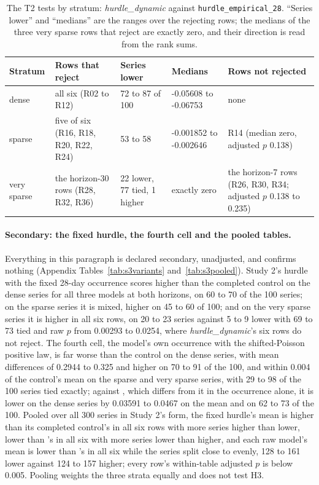 \begin{table}[t]
\centering\small
\caption{The T2 tests by stratum: \emph{hurdle\_dynamic} against \texttt{hurdle\_empirical\_28}. ``Series
lower'' and ``medians'' are the ranges over the rejecting rows; the medians of the three very sparse rows
that reject are exactly zero, and their direction is read from the rank sums.}
\label{tab:s3t2}
\begin{tabular}{lllll}
\toprule
Stratum & Rows that reject & Series lower & Medians & Rows not rejected \\
\midrule
dense & all six (R02 to R12) & 72 to 87 of 100 & -0.05608 to -0.06753 & none \\
sparse & five of six (R16, R18, R20, R22, R24) & 53 to 58 & -0.001852 to -0.002646 & R14 (median zero, adjusted $p$ 0.138) \\
very sparse & the horizon-30 rows (R28, R32, R36) & 22 lower, 77 tied, 1 higher & exactly zero & the horizon-7 rows (R26, R30, R34; adjusted $p$ 0.138 to 0.235) \\
\bottomrule
\end{tabular}
\end{table}

\paragraph{Secondary: the fixed hurdle, the fourth cell and the pooled tables.} Everything in this paragraph
is declared secondary, unadjusted, and confirms nothing (Appendix Tables~\ref{tab:s3variants}
and~\ref{tab:s3pooled}). Study 2's hurdle with the fixed 28-day occurrence scores higher than the completed
control on the dense series for all three models at both horizons, on 60 to 70 of the 100 series; on the
sparse series it is mixed, higher on 45 to 60 of 100; and on the very sparse series it is higher in all six
rows, on 20 to 23 series against 5 to 9 lower with 69 to 73 tied and raw $p$ from 0.00293 to 0.0254, where
\emph{hurdle\_dynamic}'s six rows do not reject. The fourth cell, the model's own occurrence with the
shifted-Poisson positive law, is far worse than the control on the dense series, with mean differences of
0.2944 to 0.325 and higher on 70 to 91 of the 100, and within 0.004 of the control's mean on the sparse and
very sparse series, with 29 to 98 of the 100 series tied exactly; against \hc{}, which differs from it in
the occurrence alone, it is lower on the dense series by 0.03591 to 0.0467 on the mean and on 62 to 73 of
the 100. Pooled over all 300 series in Study 2's form, the fixed hurdle's mean is higher than its completed
control's in all six rows with more series higher than lower, lower than \hc{}'s in all six with more series
lower than higher, and each raw model's mean is lower than \lm{}'s in all six while the series split close
to evenly, 128 to 161 lower against 124 to 157 higher; every row's within-table adjusted $p$ is below 0.005.
Pooling weights the three strata equally and does not test H3.

